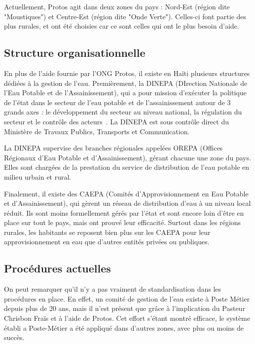 \documentclass{eplmastersthesis_FR}
\begin{document}
    			Actuellement, Protos agit dans deux zones du pays : Nord-Est (région dite "Moustiques") et Centre-Est (région dite "Onde Verte"). Celles-ci font partie des plus rurales, et ont été choisies car ce sont celles qui ont le plus besoin d'aide.

			\subsection*{Structure organisationnelle}

    			En plus de l'aide fournie par l'ONG Protos, il existe en Haïti plusieurs structures dédiées à la gestion de l'eau. Premièrement, la DINEPA (DIrection Nationale de l'Eau Potable et de l'Assainissement), qui a pour mission d’exécuter la politique de l’état dans le secteur de l’eau potable et de l’assainissement autour de 3 grands axes : le développement du secteur au niveau national, la régulation du secteur et le contrôle des acteurs~\cite{ref:dinepa}. La DINEPA est sous contrôle direct du Ministère de Travaux Publics, Transports et Communication.

    			La DINEPA supervise des branches régionales appelées OREPA (Offices Régionaux d'Eau Potable et d'Assainissement), gérant chacune une zone du pays. Elles sont chargées de la prestation du service de distribution de l'eau potable en milieu urbain et rural.

    			Finalement, il existe des CAEPA (Comités d’Approvisionnement en Eau Potable et d'Assainissement), qui gèrent un réseau de distribution d'eau à un niveau local réduit. Ils sont moins formellement gérés par l'état et sont encore loin d'être en place sur tout le pays, mais ont prouvé leur efficacité. Surtout dans les régions rurales, les habitants se reposent bien plus sur les CAEPA pour leur approvisionnement en eau que d'autres entités privées ou publiques.



			\subsection*{Procédures actuelles}

    			On peut remarquer qu'il n'y a pas vraiment de standardisation dans les procédures en place. En effet, un comité de gestion de l'eau existe à Poste Métier depuis plus de 20 ans, mais il n'est présent que grâce à l'implication du Pasteur Chrisbon Fraïs et à l'aide de Protos. Cet effort s'étant montré efficace, le système établi a Poste-Métier a été appliqué dans d'autres zones, avec plus ou moins de succès.
\end{document}
